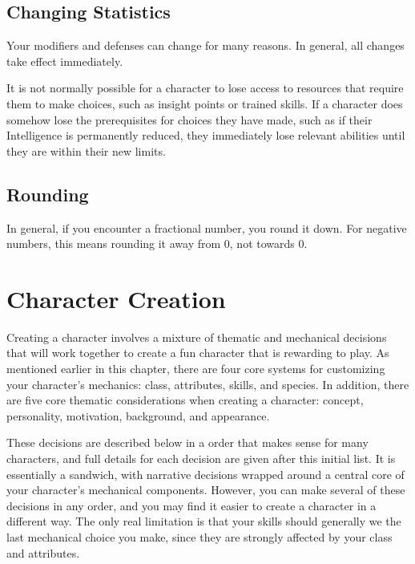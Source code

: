     \subsection{Changing Statistics}

        Your modifiers and defenses can change for many reasons.
        In general, all changes take effect immediately.

        It is not normally possible for a character to lose access to resources that require them to make choices, such as insight points or trained skills.
        If a character does somehow lose the prerequisites for choices they have made, such as if their Intelligence is permanently reduced, they immediately lose relevant abilities until they are within their new limits.

    \subsection{Rounding}
        In general, if you encounter a fractional number, you round it down.
        For negative numbers, this means rounding it away from 0, not towards 0.

\section{Character Creation}\label{Character Creation}

    Creating a character involves a mixture of thematic and mechanical decisions that will work together to create a fun character that is rewarding to play.
    As mentioned earlier in this chapter, there are four core systems for customizing your character's mechanics: class, attributes, skills, and species.
    In addition, there are five core thematic considerations when creating a character: concept, personality, motivation, background, and appearance.

    These decisions are described below in a order that makes sense for many characters, and full details for each decision are given after this initial list.
    It is essentially a sandwich, with narrative decisions wrapped around a central core of your character's mechanical components.
    However, you can make several of these decisions in any order, and you may find it easier to create a character in a different way.
    The only real limitation is that your skills should generally we the last mechanical choice you make, since they are strongly affected by your class and attributes.

